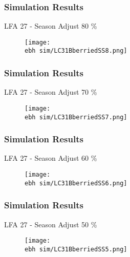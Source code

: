 \documentclass{beamer}
\newcommand{\ebh}{\string~/bio.data/bio.lobster/figures/LFA2733Framework2018/} %
\begin{document}
\begin{frame}
\frametitle{Simulation Results}
LFA 27 - Season Adjust 80 \%
\begin{figure}
        \begin{center}
            \texttt{[image: \\ebh sim/LC31BberriedSS8.png]}
        \end{center}
    \end{figure}
\end{frame}


\begin{frame}
\frametitle{Simulation Results}
LFA 27 - Season Adjust 70 \%
\begin{figure}
        \begin{center}
            \texttt{[image: \\ebh sim/LC31BberriedSS7.png]}
        \end{center}
    \end{figure}
\end{frame}


\begin{frame}
\frametitle{Simulation Results}
LFA 27 - Season Adjust 60 \%
\begin{figure}
        \begin{center}
            \texttt{[image: \\ebh sim/LC31BberriedSS6.png]}
        \end{center}
    \end{figure}
\end{frame}


\begin{frame}
\frametitle{Simulation Results}
LFA 27 - Season Adjust 50 \%
\begin{figure}
        \begin{center}
            \texttt{[image: \\ebh sim/LC31BberriedSS5.png]}
        \end{center}
    \end{figure}
\end{frame}
\end{document}
